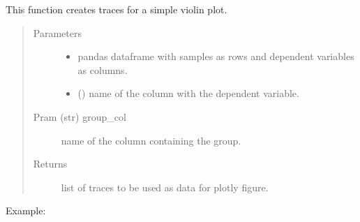 \documentclass[letterpaper,10pt,english]{sphinxmanual}
\begin{document}
\begin{fulllineitems}
\label{\detokenize{_autosummary/analytics_core.viz:analytics_core.viz.viz.create_violinplot}}
This function creates traces for a simple violin plot.
\begin{quote}\begin{description}
\item[{Parameters}] \leavevmode\begin{itemize}
\item {} 
 \textendash{} pandas dataframe with samples as rows and dependent variables as columns.

\item {} 
 (\sphinxstyleliteralemphasis{\sphinxupquote{(}}\sphinxstyleliteralemphasis{\sphinxupquote{)}}) \textendash{} name of the column with the dependent variable.

\end{itemize}

\item[{Pram (str) group\_col}] \leavevmode
name of the column containing the group.

\item[{Returns}] \leavevmode
list of traces to be used as data for plotly figure.

\end{description}\end{quote}

Example:

\begin{sphinxVerbatim}[commandchars=\\\{\}]
    
\end{sphinxVerbatim}

\end{fulllineitems}

\end{document}
